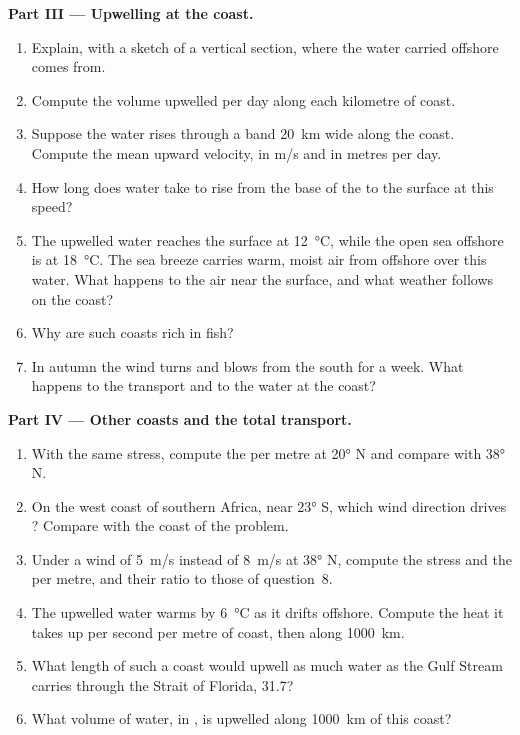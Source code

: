 \begin{problem}
\medskip
\noindent\textbf{Part III --- Upwelling at the coast.}
\begin{enumerate}[resume]
  \item Explain, with a sketch of a vertical section, where the water carried
        offshore comes from.
  \item Compute the volume upwelled per day along each kilometre of coast.
  \item Suppose the water rises through a band \qty{20}{km} wide along the coast.
        Compute the mean upward velocity, in \unit{m/s} and in metres per day.
  \item How long does water take to rise from the base of the  to the
        surface at this speed?
  \item The upwelled water reaches the surface at \qty{12}{\celsius}, while the
        open sea offshore is at \qty{18}{\celsius}. The sea breeze carries warm,
        moist air from offshore over this water. What happens to the air near the
        surface, and what weather follows on the coast?
  \item Why are such coasts rich in fish?
  \item In autumn the wind turns and blows from the south for a week. What happens
        to the transport and to the water at the coast?
\end{enumerate}

\medskip
\noindent\textbf{Part IV --- Other coasts and the total transport.}
\begin{enumerate}[resume]
  \item With the same stress, compute the  per metre at \ang{20} N
        and compare with \ang{38} N.
  \item On the west coast of southern Africa, near \ang{23} S, which wind direction
        drives ? Compare with the coast of the problem.
  \item Under a wind of \qty{5}{m/s} instead of \qty{8}{m/s} at \ang{38} N, compute
        the stress and the  per metre, and their ratio to those of
        question~8.
  \item The upwelled water warms by \qty{6}{\celsius} as it drifts offshore. Compute
        the heat it takes up per second per metre of coast, then along
        \qty{1000}{km}.
  \item What length of such a coast would upwell as much water as the Gulf Stream
        carries through the Strait of Florida, \qty{31.7}{\sverdrup}?
  \item What volume of water, in , is upwelled along \qty{1000}{km} of this
        coast?
\end{enumerate}
\end{problem}
